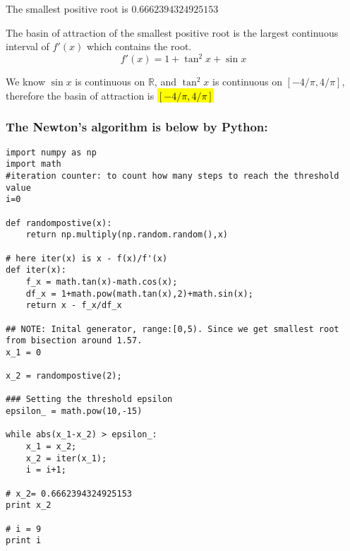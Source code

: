 \documentclass{article}
\begin{document}
The smallest positive root is \textbf{$0.6662394324925153$}


The basin of attraction of the smallest positive root is the largest continuous interval of $f'(x)$ which contains the root.
\begin{equation}
  f'(x) = 1 + \tan^2 x + \sin x
\end{equation}

We know $\sin x$ is continuous on $ \mathbb{R} $, and $\tan^2 x$ is continuous on $ [ -4/\pi , 4/\pi] $, therefore the basin of attraction is \hl{$ [ -4/\pi , 4/\pi] $}

\subsubsection*{The Newton's algorithm is below by Python:}
\begin{lstlisting}
import numpy as np
import math
#iteration counter: to count how many steps to reach the threshold value
i=0

def randompostive(x):
    return np.multiply(np.random.random(),x)

# here iter(x) is x - f(x)/f'(x)
def iter(x):
    f_x = math.tan(x)-math.cos(x);
    df_x = 1+math.pow(math.tan(x),2)+math.sin(x);
    return x - f_x/df_x

## NOTE: Inital generator, range:[0,5). Since we get smallest root from bisection around 1.57.
x_1 = 0

x_2 = randompostive(2);

### Setting the threshold epsilon
epsilon_ = math.pow(10,-15)

while abs(x_1-x_2) > epsilon_:
    x_1 = x_2;
    x_2 = iter(x_1);
    i = i+1;

# x_2= 0.6662394324925153
print x_2

# i = 9
print i
\end{lstlisting}
\end{document}
